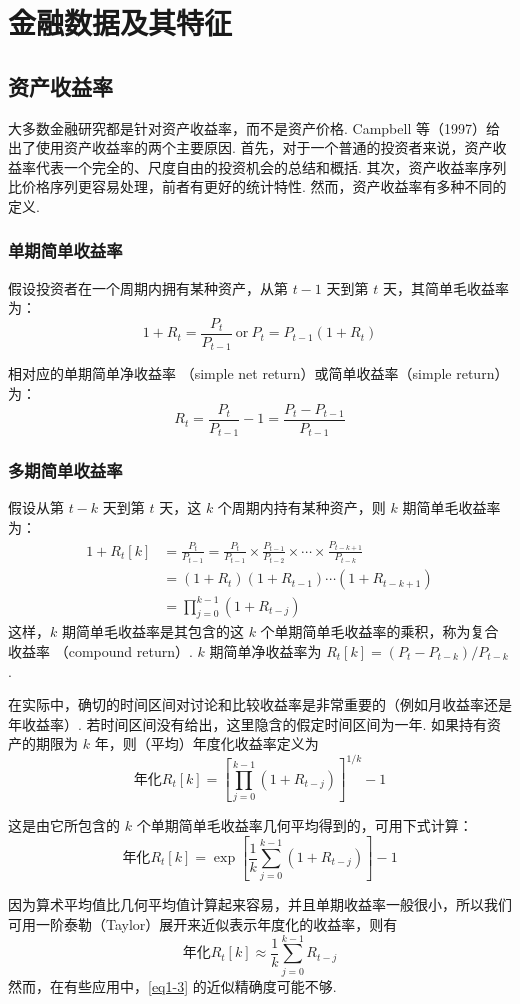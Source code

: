 \chapter{金融数据及其特征}
\section{资产收益率}
大多数金融研究都是针对资产收益率，而不是资产价格. Campbell 等（1997）给出了使用资产收益率的两个主要原因. 首先，对于一个普通的投资者来说，资产收益率代表一个完全的、尺度自由的投资机会的总结和概括. 其次，资产收益率序列比价格序列更容易处理，前者有更好的统计特性. 然而，资产收益率有多种不同的定义.
\subsection*{单期简单收益率}
假设投资者在一个周期内拥有某种资产，从第 $t-1$ 天到第 $t$ 天，其简单毛收益率为：
$$1+R_t=\frac{P_t}{P_{t-1}} ~\text{or} ~P_t=P_{t-1}(1+R_t)$$

相对应的单期简单净收益率 （simple net return）或简单收益率（simple return）为：
\begin{equation}
    R_t=\frac{P_t}{P_{t-1}}-1=\frac{P_t-P_{t-1}}{P_{t-1}}
\end{equation}

\subsection*{多期简单收益率}
假设从第 $t-k$ 天到第 $t$ 天，这 $k$ 个周期内持有某种资产，则 $k$ 期简单毛收益率为：
\begin{equation}
    \begin{aligned}
        1+R_t[k] & =\frac{P_t}{P_{t-1}}=\frac{P_t}{P_{t-1}}\times\frac{P_{t-1}}{P_{t-2}}\times\cdots\times\frac{P_{t-k+1}}{P_{t-k}} \\
                 & =(1+R_t)(1+R_{t-1})\cdots(1+R_{t-k+1})                                                                           \\
                 & =\prod_{j=0}^{k-1}(1+R_{t-j})
    \end{aligned}
\end{equation}
这样，$k$ 期简单毛收益率是其包含的这 $k$ 个单期简单毛收益率的乘积，称为复合收益率 （compound return）. $k$ 期简单净收益率为 $R_t[k]=(P_t -P_{t-k})/P_{t-k}$.

在实际中，确切的时间区间对讨论和比较收益率是非常重要的（例如月收益率还是年收益率）. 若时间区间没有给出，这里隐含的假定时间区间为一年. 如果持有资产的期限为 $k$ 年，则（平均）年度化收益率定义为
$$\text{年化}R_t[k]=\left[\prod_{j=0}^{k-1}(1+R_{t-j})\right]^{1/k}-1$$

这是由它所包含的 $k$ 个单期简单毛收益率几何平均得到的，可用下式计算：
$$\text{年化}R_t[k]=\exp\left[\frac{1}{k}\sum_{j=0}^{k-1}(1+R_{t-j})\right]-1$$

因为算术平均值比几何平均值计算起来容易，并且单期收益率一般很小，所以我们可用一阶泰勒（Taylor）展开来近似表示年度化的收益率，则有
\begin{equation}
    \label{eq1-3}
    \text{年化}R_t[k]\approx\frac{1}{k}\sum_{j=0}^{k-1}R_{t-j}
\end{equation}
然而，在有些应用中，\autoref{eq1-3} 的近似精确度可能不够.